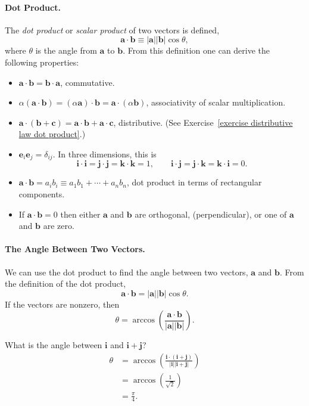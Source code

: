\paragraph{Dot Product.}
The \textit{dot product} or \textit{scalar product} of two vectors is
defined,
\[
\mathbf{a} \cdot \mathbf{b} \equiv | \mathbf{a} | | \mathbf{b} | \cos \theta,
\]
where $\theta$ is the angle from $\mathbf{a}$ to $\mathbf{b}$.  
From this definition one can derive the following properties:
\begin{itemize}
\item
$\mathbf{a} \cdot \mathbf{b} = \mathbf{b} \cdot \mathbf{a}$, 
commutative.
\item
$\alpha ( \mathbf{a} \cdot \mathbf{b} ) =
( \alpha \mathbf{a} ) \cdot \mathbf{b} =
\mathbf{a} \cdot ( \alpha \mathbf{b} )$, associativity of scalar 
multiplication.
\item
$\mathbf{a} \cdot ( \mathbf{b} + \mathbf{c} ) = 
\mathbf{a} \cdot \mathbf{b} + \mathbf{a} \cdot \mathbf{c}$,
distributive.  (See Exercise~\ref{exercise distributive law dot product}.)
\item
$\mathbf{e}_i \mathbf{e}_j = \delta_{i j}$.  In three dimensions, this is
\[ 
\mathbf{i} \cdot \mathbf{i} = \mathbf{j} \cdot \mathbf{j} =
\mathbf{k} \cdot \mathbf{k} = 1, \qquad
\mathbf{i} \cdot \mathbf{j} = \mathbf{j} \cdot \mathbf{k} = 
\mathbf{k} \cdot \mathbf{i} = 0. 
\]
\item
$\mathbf{a} \cdot \mathbf{b} = a_i b_i \equiv a_1 b_1 + \cdots + a_n b_n$, 
dot product in terms of rectangular components.
\item
If $\mathbf{a} \cdot \mathbf{b} = 0$ then either $\mathbf{a}$ and $\mathbf{b}$
are orthogonal, (perpendicular), or one of $\mathbf{a}$ and $\mathbf{b}$
are zero.
\end{itemize}


\paragraph{The Angle Between Two Vectors.}
We can use the dot product to find the angle between two vectors,
$\mathbf{a}$ and $\mathbf{b}$.   From the definition of the dot product,
\[
\mathbf{a} \cdot \mathbf{b} = | \mathbf{a} | | \mathbf{b} | \cos \theta.
\]
If the vectors are nonzero, then
\[
\theta = \arccos \left( \frac{ \mathbf{a} \cdot \mathbf{b} }
                { | \mathbf{a} | | \mathbf{b} | }  \right).
\]




\begin{Example}
What is the angle between $\mathbf{i}$ and $\mathbf{i} + \mathbf{j}$?
\begin{align*}
\theta
        &= \arccos \left( \frac{ \mathbf{i} \cdot (\mathbf{i} + \mathbf{j} ) }
                { | \mathbf{i} | | \mathbf{i} + \mathbf{j} | } \right) \\
        &= \arccos \left( \frac{1}{\sqrt{2}} \right) \\
        &= \frac{\pi}{4}.
\end{align*}
\end{Example}





